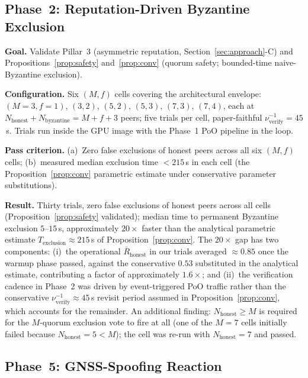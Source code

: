 \documentclass[journal,10pt,twocolumn]{IEEEtran}
\begin{document}
\subsection{Phase~2: Reputation-Driven Byzantine Exclusion}
\label{sec:phase2-exclusion}
\label{sec:exp3-byz-detection}

\textbf{Goal.} Validate Pillar~3 (asymmetric reputation, Section~\ref{sec:approach}-C) and Propositions~\ref{prop:safety} and~\ref{prop:conv} (quorum safety; bounded-time naive-Byzantine exclusion).

\textbf{Configuration.} Six $(M,f)$ cells covering the architectural envelope: $(M{=}3,f{=}1)$, $(3,2)$, $(5,2)$, $(5,3)$, $(7,3)$, $(7,4)$, each at $N_\text{honest}{+}N_\text{byzantine}=M{+}f{+}3$ peers; five trials per cell, paper-faithful $\nu_\text{verify}^{-1}=45$\,s. Trials run inside the GPU image with the Phase~1 PoO pipeline in the loop.

\textbf{Pass criterion.} (a)~Zero false exclusions of honest peers across all six $(M,f)$ cells; (b)~measured median exclusion time $<215$\,s in each cell (the Proposition~\ref{prop:conv} parametric estimate under conservative parameter substitutions).

\textbf{Result.} Thirty trials, zero false exclusions of honest peers across all cells (Proposition~\ref{prop:safety} validated); median time to permanent Byzantine exclusion $5$--$15$\,s, approximately $20\times$ faster than the analytical parametric estimate $T_\text{exclusion}\approx 215$\,s of Proposition~\ref{prop:conv}. The $20\times$ gap has two components: (i)~the operational $\bar R_\text{honest}$ in our trials averaged $\approx 0.85$ once the warmup phase passed, against the conservative $0.53$ substituted in the analytical estimate, contributing a factor of approximately $1.6\times$; and (ii)~the verification cadence in Phase~2 was driven by event-triggered PoO traffic rather than the conservative $\nu_\text{verify}^{-1}\approx 45$\,s revisit period assumed in Proposition~\ref{prop:conv}, which accounts for the remainder. An additional finding: $N_\text{honest}\geq M$ is required for the $M$-quorum exclusion vote to fire at all (one of the $M{=}7$ cells initially failed because $N_\text{honest}{=}5{<}M$); the cell was re-run with $N_\text{honest}{=}7$ and passed.

\subsection{Phase~5: GNSS-Spoofing Reaction}
\label{sec:phase5-spoofing}
\end{document}
